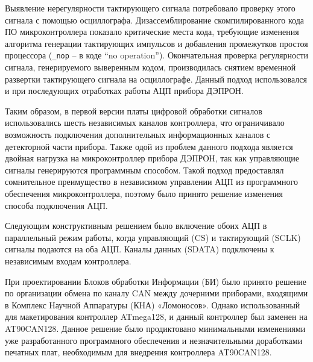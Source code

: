 
Выявление нерегулярности тактирующего сигнала потребовало проверку этого сигнала с помощью осциллографа. Дизассемблирование скомпилированного кода ПО микроконтроллера показало критические места кода, требующие изменения алгоритма генерации тактирующих импульсов и добавления промежутков простоя процессора (\texttt{\_nop} -- в коде ``no operation''). Окончательная проверка регулярности сигнала, генерируемого выверенным кодом, производилась снятием временной развертки тактирующего сигнала  на осциллографе. Данный подход использовался и при последующих отработках работы АЦП прибора ДЭПРОН.


Таким образом, в первой версии платы цифровой обработки сигналов использовались шесть независимых каналов контроллера, что ограничивало возможность подключения дополнительных информационных каналов с детекторной части прибора. Также одой из проблем данного подхода является двойная нагрузка на микроконтроллер прибора ДЭПРОН, так как управляющие сигналы генерируются программным способом. Такой подход предоставлял сомнительное преимущество в независимом управлении АЦП из программного обеспечения микроконтроллера, поэтому было принято решение изменения способа подключения АЦП.

Следующим конструктивным решением было включение обоих АЦП в параллельный режим работы, когда управляющий (CS) и тактирующий (SCLK) сигналы подаются на оба АЦП. Каналы данных (SDATA) подключены к независимым входам контроллера. 


При проектировании Блоков обработки Информации (БИ) было принято решение по организации обмена по каналу CAN между дочерними приборами, входящими в Комплекс Научной Аппаратуры (КНА) «Ломоносов». Однако использованный для макетирования контроллер ATmega128, и данный контроллер был заменен на AT90CAN128. Данное решение было продиктовано минимальными изменениями уже разработанного программного обеспечения и незначительными доработками печатных плат, необходимым для внедрения контроллера AT90CAN128.

